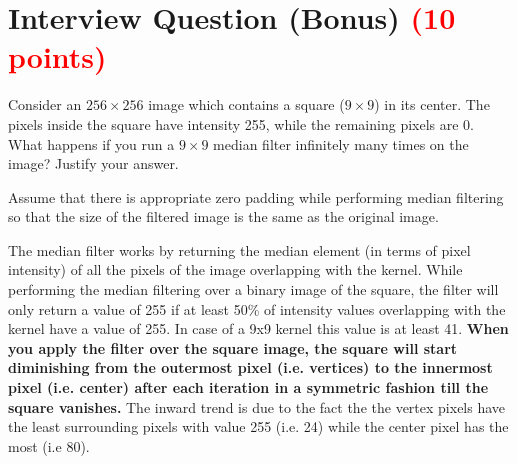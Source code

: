 \documentclass[answers]{exam}
\newcommand{\mypoints}[1]{\textcolor{red}{(#1 points)}}
\begin{document}
\section{Interview Question (Bonus) \mypoints{10}}
Consider an $256 \times 256$ image which contains a square ($9 \times 9$) in its center. The pixels inside the square have intensity 255, while the remaining pixels are 0. What happens if you run a $9 \times 9$ median filter infinitely many times on the image? Justify your answer.

Assume that there is appropriate zero padding while performing median filtering so that the size of the filtered image is the same as the original image. 

\begin{solution}
The median filter works by returning the median element (in terms of pixel intensity) of all the pixels of the image overlapping with the kernel. While performing the median filtering over a binary image of the square, the filter will only return a value of 255 if at least 50\% of intensity values overlapping with the kernel have a value of 255. In case of a 9x9 kernel this value is at least 41. \textbf{When you apply the filter over the square image, the square will start diminishing from the outermost pixel (i.e. vertices) to the innermost pixel (i.e. center) after each iteration in a symmetric fashion till the square vanishes.} The inward trend is due to the fact the the vertex pixels have the least surrounding pixels with value 255 (i.e. 24) while the center pixel has the most (i.e 80).


\end{solution}

% 
% 
\end{document}
